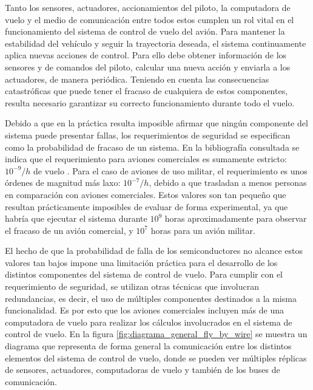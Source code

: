Tanto los sensores, actuadores, accionamientos del piloto, la computadora de vuelo y el medio de comunicación entre todos estos cumplen un rol vital en el funcionamiento del sistema de control de vuelo del avión. Para mantener la estabilidad del vehículo y seguir la trayectoria deseada, el sistema continuamente aplica nuevas acciones de control. Para ello debe obtener información de los sensores y de comandos del piloto, calcular una nueva acción y enviarla a los actuadores, de manera periódica. Teniendo en cuenta las consecuencias catastróficas que puede tener el fracaso de cualquiera de estos componentes, resulta necesario garantizar su correcto funcionamiento durante todo el vuelo.

Debido a que en la práctica resulta imposible afirmar que ningún componente del sistema puede presentar fallas, los requerimientos de seguridad se especifican como la probabilidad de fracaso de un sistema. En la bibliografía consultada se indica que el requerimiento para aviones comerciales es sumamente estricto: $10^{-9}/h$ de vuelo \cite[p.~217]{collinson2023introduction} \cite{yeh1996triple} \cite{lala1994architectural}. Para el caso de aviones de uso militar, el requerimiento es unos órdenes de magnitud más laxo: $10^{-7}/h$, debido a que trasladan a menos personas en comparación con aviones comerciales. Estos valores son tan pequeño que resultan prácticamente imposibles de evaluar de forma experimental, ya que habría que ejecutar el sistema durante $10^9$ horas aproximadamente para observar el fracaso de un avión comercial, y $10^7$ horas para un avión militar.

El hecho de que la probabilidad de falla de los semiconductores no alcance estos valores tan bajos \cite[p.~4]{Fulton2014AirborneEH} impone una limitación práctica para el desarrollo de los distintos componentes del sistema de control de vuelo. Para cumplir con el requerimiento de seguridad, se utilizan otras técnicas que involucran redundancias, es decir, el uso de múltiples componentes destinados a la misma funcionalidad. Es por esto que los aviones comerciales incluyen más de una computadora de vuelo para realizar los cálculos involucrados en el sistema de control de vuelo. En la figura \ref{fig:diagrama_general_fly_by_wire} se muestra un diagrama que representa de forma general la comunicación entre los distintos elementos del sistema de control de vuelo, donde se pueden ver múltiples réplicas de sensores, actuadores, computadoras de vuelo y también de los buses de comunicación.



